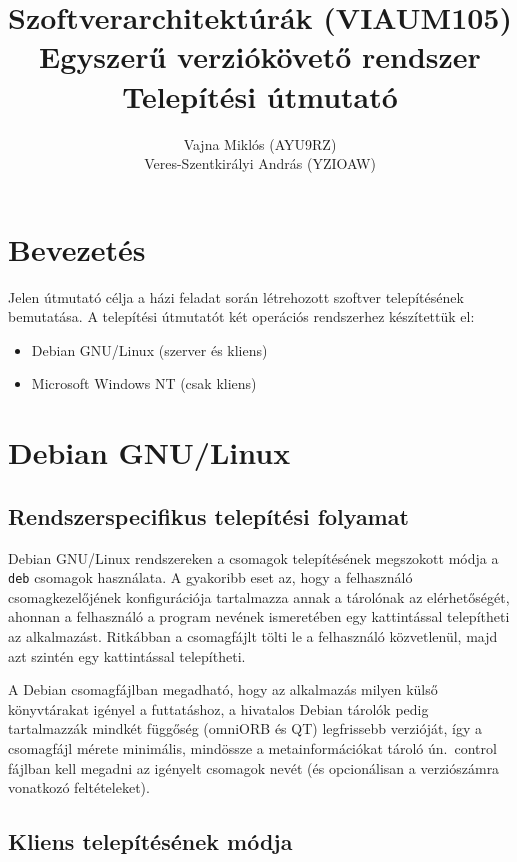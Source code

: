 \documentclass[a4paper,12pt]{article}
\title{Szoftverarchitektúrák (VIAUM105)\\Egyszerű verziókövető rendszer\\Telepítési útmutató}
\author{Vajna Miklós (AYU9RZ)\\Veres-Szentkirályi András (YZIOAW)}
\begin{document}
\maketitle
\thispagestyle{empty}

\pagebreak
\onehalfspacing
\section{Bevezetés}

Jelen útmutató célja a házi feladat során létrehozott szoftver telepítésének
bemutatása. A telepítési útmutatót két operációs rendszerhez készítettük el:

\begin{itemize}
\item Debian GNU/Linux (szerver és kliens)
\item Microsoft Windows NT (csak kliens)
\end{itemize}

\section{Debian GNU/Linux}

\subsection{Rendszerspecifikus telepítési folyamat}

Debian GNU/Linux rendszereken a csomagok telepítésének megszokott módja a
\verb|deb| csomagok használata. A gyakoribb eset az, hogy a felhasználó
csomagkezelőjének konfigurációja tartalmazza annak a tárolónak az elérhetőségét,
ahonnan a felhasználó a program nevének ismeretében egy kattintással telepítheti
az alkalmazást. Ritkábban a csomagfájlt tölti le a felhasználó közvetlenül,
majd azt szintén egy kattintással telepítheti.

A Debian csomagfájlban megadható, hogy az alkalmazás milyen külső könyvtárakat
igényel a futtatáshoz, a hivatalos Debian tárolók pedig tartalmazzák mindkét
függőség (omniORB és QT) legfrissebb verzióját, így a csomagfájl mérete minimális,
mindössze a metainformációkat tároló ún.\ control fájlban kell megadni az igényelt
csomagok nevét (és opcionálisan a verziószámra vonatkozó feltételeket).

\subsection{Kliens telepítésének módja}
\end{document}
